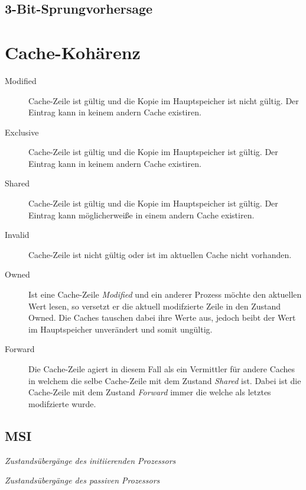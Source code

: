 \documentclass
[
	8pt,		%
	ngerman,	%
	a4paper,	%
	landscape,	%
	final		%
]{extarticle}
\begin{document}
\begin{multicols*}{4}
\subsection{3-Bit-Sprungvorhersage}
\begin{center}
	
\end{center}
\section{Cache-Kohärenz}
\begin{description}
	\item[Modified] Cache-Zeile ist gültig und die Kopie im Hauptspeicher
	      ist nicht gültig. Der Eintrag kann in keinem andern Cache
	      existiren.
	\item[Exclusive] Cache-Zeile ist gültig und die Kopie im Hauptspeicher
	      ist gültig. Der Eintrag kann in keinem andern Cache existiren.
	\item[Shared] Cache-Zeile ist gültig und die Kopie im Hauptspeicher
	      ist gültig. Der Eintrag kann möglicherweiße in einem andern Cache
	      existiren.
	\item[Invalid] Cache-Zeile ist nicht gültig oder ist im aktuellen Cache
	      nicht vorhanden.
	\item[Owned] Ist eine Cache-Zeile \textit{Modified} und ein anderer
	      Prozess möchte den aktuellen Wert lesen, so versetzt er die
	      aktuell modifzierte Zeile in den Zustand Owned. Die Caches
	      tauschen dabei ihre Werte aus, jedoch beibt der Wert im
	      Hauptspeicher unverändert und somit ungültig.
	\item[Forward] Die Cache-Zeile agiert in diesem Fall als ein Vermittler
	      für andere Caches in welchem die selbe Cache-Zeile mit dem Zustand
	      \textit{Shared} ist. Dabei ist die Cache-Zeile mit dem Zustand
	      \textit{Forward} immer die welche als letztes modifzierte wurde.
\end{description}
\subsection{MSI}
\begin{center}
	
	{\small\textit{Zustandsübergänge des initiierenden Prozessors}}
	
	{\small\textit{Zustandsübergänge des passiven Prozessors}}
\end{center}

\end{multicols*}
\end{document}
